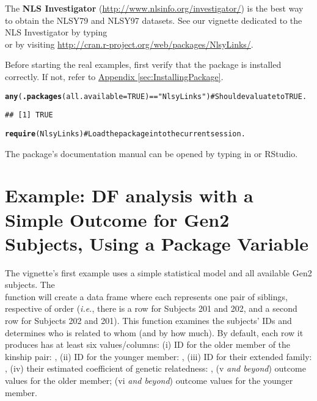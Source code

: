 \documentclass[letterpaper]{article}\usepackage{graphicx, color}
\makeatletter
\newcommand{\hlfunctioncall}[1]{\textcolor[rgb]{0.501960784313725,0,0.329411764705882}{\textbf{#1}}}%
\newcommand{\hlstring}[1]{\textcolor[rgb]{0.6,0.6,1}{#1}}%
\newcommand{\hlcomment}[1]{\textcolor[rgb]{0.180392156862745,0.6,0.341176470588235}{#1}}%
\newenvironment{kframe}{%
 \def\at@end@of@kframe{}%
 \ifinner\ifhmode%
  \def\at@end@of@kframe{\end{minipage}}%
  \begin{minipage}{\columnwidth}%
 \fi\fi%
 \def\FrameCommand##1{\hskip\@totalleftmargin \hskip-\fboxsep
 \colorbox{shadecolor}{##1}\hskip-\fboxsep
     \hskip-\linewidth \hskip-\@totalleftmargin \hskip\columnwidth}%
 \MakeFramed {\advance\hsize-\width
   \@totalleftmargin\z@ \linewidth\hsize
   \@setminipage}}%
 {\par\unskip\endMakeFramed%
 \at@end@of@kframe}
\newenvironment{knitrout}{}{} %
\makeatother
\begin{document}
The \textbf{NLS Investigator}\label{term:NlsInvestigator} (\url{http://www.nlsinfo.org/investigator/}) is the best way to obtain the NLSY79 and NLSY97 datasets.  See our vignette dedicated to the NLS Investigator by typing\\  or by visiting \url{http://cran.r-project.org/web/packages/NlsyLinks/}.

Before starting the real examples, first verify that the  package is installed correctly.  If not, refer to \hyperref[sec:InstallingPackage]{Appendix \ref*{sec:InstallingPackage}}.
\begin{knitrout}
\color{fgcolor}\begin{kframe}
\begin{alltt}
\hlfunctioncall{any}(\hlfunctioncall{.packages}(all.available = TRUE) == \hlstring{"NlsyLinks"})  #Should evaluate to TRUE.
\end{alltt}
\begin{verbatim}
## [1] TRUE
\end{verbatim}
\begin{alltt}
\hlfunctioncall{require}(NlsyLinks)  \hlcomment{#Load the package into the current session.}
\end{alltt}
\end{kframe}
\end{knitrout}

The package's documentation manual can be opened by typing  in
\R{} or RStudio.

\section{Example: DF analysis with a Simple Outcome for Gen2 Subjects, Using a Package Variable}
The vignette's first example uses a simple statistical model and all available Gen2 subjects.  The \\ function will create a data frame where each represents one pair of siblings, respective of order (\emph{i.e.}, there is a row for Subjects 201 and 202, and a second row for Subjects 202 and 201). This function examines the subjects' IDs and determines who is related to whom (and by how much).  By default, each row it produces has at least six values/columns: (i) ID for the older member of the kinship pair: , (ii) ID for the younger member: , (iii) ID for their extended family: , (iv) their estimated coefficient of genetic relatedness: , (v \emph{and beyond}) outcome values for the older member; (vi \emph{and beyond}) outcome values for the younger member.  
\end{document}
